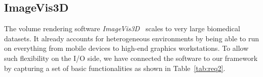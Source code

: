 \documentclass[twoside,twocolumn,10pt]{article}
\begin{document}
%


\subsection{ImageVis3D}

The volume rendering software \textit{ImageVis3D}~\cite{Fogal:2010:Tuvok} scales to very large biomedical datasets. It already accounts for heterogeneous environments by being able to run on everything from mobile devices to high-end graphics workstations. To allow such flexibility on the I/O side, we have connected the software to our framework by capturing a set of basic functionalities as shown in Table~\ref{tab:req2}.

\begin{table}[htb]
\small
{}
\caption{A set of ImageVis3D requirements. The one-dimensional transfer function is denoted by 1D-TF and isosurface rendering by Iso.}
\vskip-1mm
\label{tab:req2}
\end{table}
\end{document}
